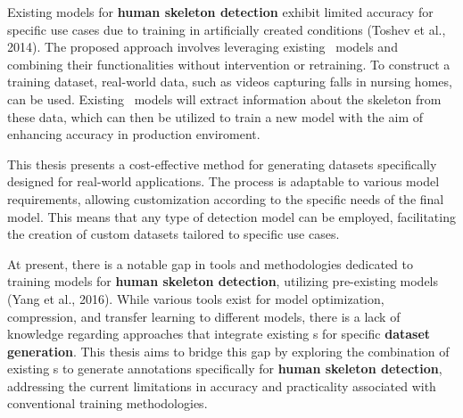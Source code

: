 Existing models for {\bf human skeleton detection} exhibit limited accuracy for specific use cases due to training in artificially created conditions (\scc Toshev et al., 2014). The proposed approach involves leveraging existing \NN\ models and combining their functionalities without intervention or retraining. To construct a training dataset, real-world data, such as videos capturing falls in nursing homes, can be used. Existing \NN\ models will extract information about the skeleton from these data, which can then be utilized to train a new model with the aim of enhancing accuracy in production enviroment.

This thesis presents a cost-effective method for generating datasets specifically designed for real-world applications. The process is adaptable to various model requirements, allowing customization according to the specific needs of the final model. This means that any type of detection model can be employed, facilitating the creation of custom datasets tailored to specific use cases.


At present, there is a notable gap in tools and methodologies dedicated to training models for {\bf human skeleton detection}, utilizing pre-existing models (\scc Yang et al., 2016). While various tools exist for model optimization, compression, and transfer learning to different models, there is a lack of knowledge regarding approaches that integrate existing \NN\-s for specific {\bf dataset generation}. This thesis aims to bridge this gap by exploring the combination of existing \NN\-s to generate annotations specifically for {\bf human skeleton detection}, addressing the current limitations in accuracy and practicality associated with conventional training methodologies.
